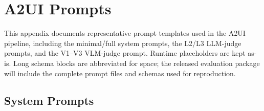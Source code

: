 \documentclass{llmxive}
\begin{document}
\section{A2UI Prompts}
\label{app:a2ui-prompts}

This appendix documents representative prompt templates used in the A2UI pipeline, including the minimal/full system prompts, the L2/L3 LLM-judge prompts, and the V1--V3 VLM-judge prompt. Runtime placeholders are kept as-is. Long schema blocks are abbreviated for space; the released evaluation package will include the complete prompt files and schemas used for reproduction.

\subsection{System Prompts}
\label{app:a2ui-system-prompts}
\end{document}
